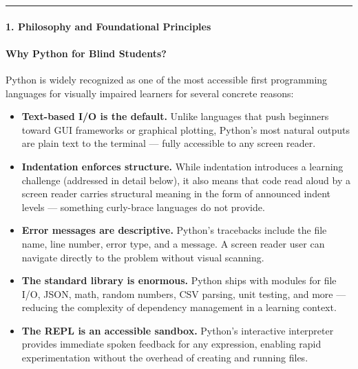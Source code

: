 \documentclass[
  justified,
  openright,
]{tufte-book}
\let\subsection\paragraph
\let\paragraph\paragraph
\let\subsection\paragraph
\let\paragraph\paragraph
\providecommand{\tightlist}{%
  \setlength{\itemsep}{0pt}\setlength{\parskip}{0pt}}
\begin{document}
\begin{center}\rule{0.5\linewidth}{0.5pt}\end{center}

\subsection{1. Philosophy and Foundational
Principles}\label{philosophy-and-foundational-principles}

\subsection{Why Python for Blind
Students?}\label{why-python-for-blind-students}

Python is widely recognized as one of the most accessible first
programming languages for visually impaired learners for several
concrete reasons:

\begin{itemize}
\tightlist
\item
  \textbf{Text-based I/O is the default.} Unlike languages that push
  beginners toward GUI frameworks or graphical plotting, Python's most
  natural outputs are plain text to the terminal --- fully accessible to
  any screen reader.
\item
  \textbf{Indentation enforces structure.} While indentation introduces
  a learning challenge (addressed in detail below), it also means that
  code read aloud by a screen reader carries structural meaning in the
  form of announced indent levels --- something curly-brace languages do
  not provide.
\item
  \textbf{Error messages are descriptive.} Python's tracebacks include
  the file name, line number, error type, and a message. A screen reader
  user can navigate directly to the problem without visual scanning.
\item
  \textbf{The standard library is enormous.} Python ships with modules
  for file I/O, JSON, math, random numbers, CSV parsing, unit testing,
  and more --- reducing the complexity of dependency management in a
  learning context.
\item
  \textbf{The REPL is an accessible sandbox.} Python's interactive
  interpreter provides immediate spoken feedback for any expression,
  enabling rapid experimentation without the overhead of creating and
  running files.
\end{itemize}
\end{document}
